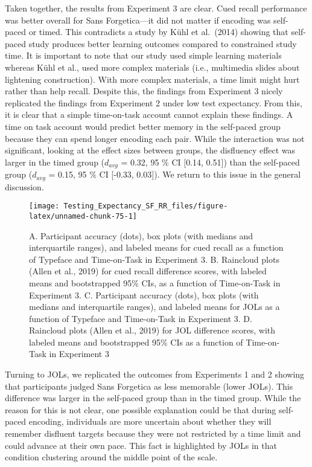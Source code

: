 \documentclass[
  english,
  jou]{apa7}
\begin{document}
Taken together, the results from Experiment 3 are clear. Cued recall performance was better overall for Sans Forgetica---it did not matter if encoding was self-paced or timed. This contradicts a study by Kühl et al.~(2014) showing that self-paced study produces better learning outcomes compared to constrained study time. It is important to note that our study used simple learning materials whereas Kühl et al., used more complex materials (i.e., multimedia slides about lightening construction). With more complex materials, a time limit might hurt rather than help recall. Despite this, the findings from Experiment 3 nicely replicated the findings from Experiment 2 under low test expectancy. From this, it is clear that a simple time-on-task account cannot explain these findings. A time on task account would predict better memory in the self-paced group because they can spend longer encoding each pair. While the interaction was not significant, looking at the effect sizes between groups, the disfluency effect was larger in the timed group (\(d_{avg}\) = 0.32, 95 \% CI {[}0.14, 0.51{]}) than the self-paced group (\(d_{avg}\) = 0.15, 95 \% CI {[}-0.33, 0.03{]}). We return to this issue in the general discussion.

\begin{figure}

{\centering \texttt{[image: Testing\_Expectancy\_SF\_RR\_files/figure-latex/unnamed-chunk-75-1]} 

}

\caption{A. Participant accuracy (dots), box plots (with medians and interquartile ranges), and labeled means for cued recall as a function of Typeface and Time-on-Task in Experiment 3. B. Raincloud plots (Allen et al., 2019) for cued recall difference scores, with labeled means and bootstrapped 95\% CIs, as a function of Time-on-Task in Experiment 3. C. Participant accuracy (dots), box plots (with medians and interquartile ranges), and labeled means for JOLs as a function of Typeface and Time-on-Task in Experiment 3. D. Raincloud plots (Allen et al., 2019) for JOL difference scores, with labeled means and bootstrapped 95\% CIs as a function of Time-on-Task in Experiment 3}\label{fig:unnamed-chunk-75}
\end{figure}

Turning to JOLs, we replicated the outcomes from Experiments 1 and 2 showing that participants judged Sans Forgetica as less memorable (lower JOLs). This difference was larger in the self-paced group than in the timed group. While the reason for this is not clear, one possible explanation could be that during self-paced encoding, individuals are more uncertain about whether they will remember disfluent targets because they were not restricted by a time limit and could advance at their own pace. This fact is highlighted by JOLs in that condition clustering around the middle point of the scale.
\end{document}
